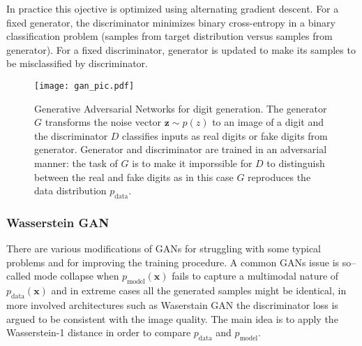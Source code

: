 \documentclass{webofc}
\newcommand{\vx}{\mathbf{x}}
\newcommand{\vz}{\mathbf{z}}
\newcommand{\pdata}{\ensuremath{p_{\text{data}}}}
\begin{document}
In practice this ojective is optimized using alternating gradient descent. For a fixed generator, the discriminator minimizes binary cross-entropy in a binary classification problem (samples from target distribution versus samples from generator). For a fixed discriminator, generator is updated to make its samples to be misclassified by discriminator.   


\begin{figure}
\centering
\texttt{[image: gan\_pic.pdf]}
\caption{Generative Adversarial Networks for digit generation. The generator $G$ transforms the noise vector $\vz \sim p(z)$ to an image of a digit and the discriminator $D$ classifies inputs as real digits or fake digits from generator. Generator and discriminator are trained in an adversarial manner: the task of $G$ is to make it imporssible for $D$ to distinguish between the real and fake digits as in this case $G$ reproduces the data distribution $\pdata$.}
\label{fig:GANs}
\end{figure}



\subsubsection{Wasserstein GAN}
There are various modifications of GANs for struggling with some typical problems and for improving the training procedure. A common GANs issue is so--called mode collapse when $p_\text{model} (\vx)$ fails to capture a multimodal nature of $\pdata(\vx)$ and in extreme cases all the generated samples might be identical, in more involved architectures such as Waserstain GAN \cite{arjovsky2017wasserstein} the discriminator loss is argued to be consistent with the image quality. The main idea is to apply the Wasserstein-1 distance in order to compare $\pdata$ and $p_{\text{model}}$.
\end{document}
